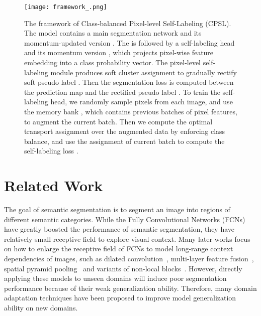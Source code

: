 \documentclass[10pt,twocolumn,letterpaper]{article}
\begin{document}
	
\begin{figure*}
		\centering
		\texttt{[image: framework\_.png]}\\
		\caption{The framework of Class-balanced Pixel-level Self-Labeling (CPSL). The model contains a main segmentation network  and its momentum-updated version . The  is followed by a self-labeling head  and its momentum version , which projects pixel-wise feature embedding into a class probability vector. The pixel-level self-labeling module produces soft cluster assignment  to gradually rectify soft pseudo label . Then the segmentation loss  is computed between the prediction map  and the rectified pseudo label . To train the self-labeling head, we randomly sample pixels from each image, and use the memory bank , which contains previous batches of pixel features, to augment the current batch. Then we compute the optimal transport assignment  over the augmented data by enforcing class balance, and use the assignment of current batch  to compute the self-labeling loss .}
		\label{0fig1}
		\vspace{-0.5em}
	\end{figure*}
	\section{Related Work}
	 The goal of semantic segmentation is to segment an image into regions of different semantic categories. While the Fully Convolutional Networks (FCNs) \cite{long2015fully} have greatly boosted the performance of semantic segmentation, they have relatively small receptive field to explore visual context. Many later works focus on how to enlarge the receptive field of FCNs to model long-range context dependencies of images, such as dilated convolution~\cite{chen2017deeplab}, multi-layer feature fusion~\cite{lin2017refinenet}, spatial pyramid pooling~\cite{zhao2017pyramid} and variants of non-local blocks~\cite{fu2019dual,huang2019ccnet,hu2018squeeze}.
	However, directly applying these models to unseen domains will induce poor segmentation performance because of their weak generalization ability. Therefore, many domain adaptation techniques have been proposed to improve model generalization ability on new domains. 
	
\end{document}
